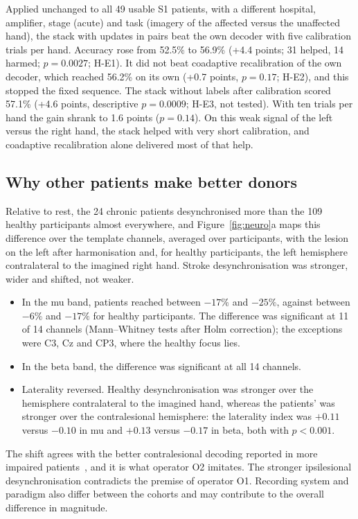 \documentclass[pdflatex,sn-mathphys-num]{sn-jnl}
\begin{document}
Applied unchanged to all 49 usable S1 patients, with a different hospital, amplifier, stage (acute) and task (imagery of the affected versus the unaffected hand), the stack with updates in pairs beat the own decoder with five calibration trials per hand. Accuracy rose from 52.5\% to 56.9\% (+4.4 points; 31 helped, 14 harmed; $p = 0.0027$; H-E1). It did not beat coadaptive recalibration of the own decoder, which reached 56.2\% on its own (+0.7 points, $p = 0.17$; H-E2), and this stopped the fixed sequence. The stack without labels after calibration scored 57.1\% (+4.6 points, descriptive $p = 0.0009$; H-E3, not tested). With ten trials per hand the gain shrank to 1.6 points ($p = 0.14$). On this weak signal of the left versus the right hand, the stack helped with very short calibration, and coadaptive recalibration alone delivered most of that help.

\subsection{Why other patients make better donors}\label{sec:res-neuro}

Relative to rest, the 24 chronic patients desynchronised more than the 109 healthy participants almost everywhere, and Figure~\ref{fig:neuro}a maps this difference over the template channels, averaged over participants, with the lesion on the left after harmonisation and, for healthy participants, the left hemisphere contralateral to the imagined right hand. Stroke desynchronisation was stronger, wider and shifted, not weaker.
\begin{itemize}
\item In the mu band, patients reached between $-17\%$ and $-25\%$, against between $-6\%$ and $-17\%$ for healthy participants. The difference was significant at 11 of 14 channels (Mann--Whitney tests after Holm correction); the exceptions were C3, Cz and CP3, where the healthy focus lies.
\item In the beta band, the difference was significant at all 14 channels.
\item Laterality reversed. Healthy desynchronisation was stronger over the hemisphere contralateral to the imagined hand, whereas the patients' was stronger over the contralesional hemisphere: the laterality index was $+0.11$ versus $-0.10$ in mu and $+0.13$ versus $-0.17$ in beta, both with $p < 0.001$.
\end{itemize}
The shift agrees with the better contralesional decoding reported in more impaired patients~\cite{mansour2022}, and it is what operator O2 imitates. The stronger ipsilesional desynchronisation contradicts the premise of operator O1. Recording system and paradigm also differ between the cohorts and may contribute to the overall difference in magnitude.
\end{document}

